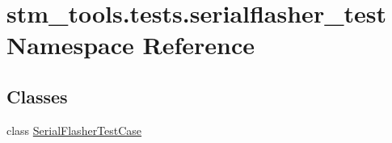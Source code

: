 \hypertarget{namespacestm__tools_1_1tests_1_1serialflasher__test}{}\section{stm\+\_\+tools.\+tests.\+serialflasher\+\_\+test Namespace Reference}
\label{namespacestm__tools_1_1tests_1_1serialflasher__test}
\subsection*{Classes}
\begin{DoxyCompactItemize}
\item 
class \hyperlink{classstm__tools_1_1tests_1_1serialflasher__test_1_1SerialFlasherTestCase}{Serial\+Flasher\+Test\+Case}
\end{DoxyCompactItemize}

